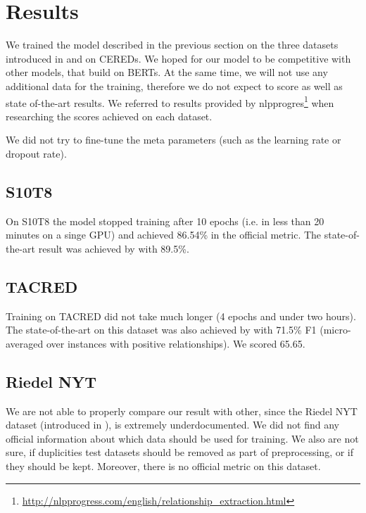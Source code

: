 \section{Results}

We trained the model described in the previous section on the three datasets introduced in  and on CEREDs. We hoped for our model to be competitive with other models, that build on BERTs. At the same time, we will not use any additional data for the training, therefore we do not expect to score as well as state of-the-art results. We referred to results provided by nlpprogres\footnote{\url{http://nlpprogress.com/english/relationship_extraction.html}} when researching the scores achieved on each dataset.

We did not try to fine-tune the meta parameters (such as the learning rate or dropout rate). 


\subsection{S10T8}

On S10T8 the model stopped training after 10 epochs (i.e. in less than 20 minutes on a singe GPU) and achieved  86.54\% in the official metric. The state-of-the-art result was achieved by \cite{baldini-soares-etal-2019-matching} with 89.5\%.

\subsection{TACRED}

Training on TACRED did not take much longer (4 epochs and under two hours). The state-of-the-art on this dataset was also achieved by \cite{baldini-soares-etal-2019-matching} with 71.5\% F1 (micro-averaged over instances with positive relationships). We scored 65.65.

\subsection{Riedel NYT}
We are not able to properly compare our result with other, since the Riedel NYT dataset (introduced in \citep{nytdistant}), is extremely underdocumented. We did not find any official information about which data should be used for training. We also are not sure, if duplicities test datasets should be removed as part of preprocessing, or if they should be kept. Moreover, there is no official metric on this dataset. 

